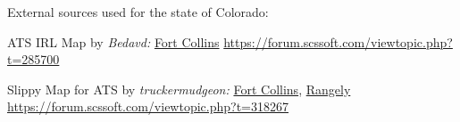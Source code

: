 















\vspace{2em}\footnoterule
{\footnotesize \noindent External sources used for the state of Colorado:
\begin{description}[
	style=nextline,
	leftmargin=1.1em,
	labelsep=0pt,
	parsep=0pt,
	font=\normalfont,
]

\item[$\ast$]
ATS IRL Map by \textit{Bedavd:}
\hyperref[city:Fort Collins]{Fort Collins}
\url{https://forum.scssoft.com/viewtopic.php?t=285700}

\item[$\dagger$]
Slippy Map for ATS by \textit{truckermudgeon:}
\hyperref[city:Fort Collins]{Fort Collins},
\hyperref[city:Rangely]{Rangely}
\url{https://forum.scssoft.com/viewtopic.php?t=318267}

\end{description}
}

